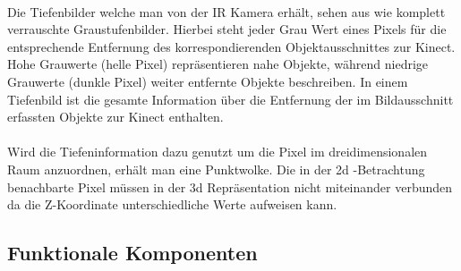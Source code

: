 \\
Die Tiefenbilder welche man von der IR Kamera erhält, sehen aus wie komplett verrauschte Graustufenbilder. Hierbei steht jeder Grau Wert eines Pixels für die entsprechende Entfernung des korrespondierenden Objektausschnittes zur Kinect.\\
Hohe Grauwerte (helle Pixel) repräsentieren nahe Objekte, während niedrige Grauwerte (dunkle Pixel) weiter entfernte Objekte beschreiben. In einem Tiefenbild ist die gesamte Information über die Entfernung der im Bildausschnitt erfassten Objekte zur Kinect enthalten.\\\\
Wird die Tiefeninformation dazu genutzt um die Pixel im dreidimensionalen Raum anzuordnen, erhält man eine Punktwolke. Die in der 2d 
-Betrachtung benachbarte Pixel müssen in der 3d Repräsentation nicht miteinander verbunden da die Z-Koordinate unterschiedliche Werte aufweisen kann.
\subsection{Funktionale Komponenten}
